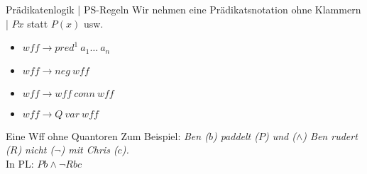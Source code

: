 \begin{frame}
  {Prädikatenlogik | PS-Regeln}
  \onslide<+->
  \onslide<+->
  Wir nehmen eine \alert{Prädikatsnotation ohne Klammern} | $Px$ statt $P(x)$ usw.\\
  \Halbzeile
  \begin{itemize}[<+->]
    \item $wff\rightarrow pred^1\ a_1\ldots\ a_n$ 
    \item $wff\rightarrow neg\ wff$ 
    \item $wff\rightarrow wff\ conn\ wff$ 
    \item $wff\rightarrow Q\ var\ wff$ 
  \end{itemize}
\end{frame}

\begin{frame}
  {Eine Wff ohne Quantoren}
  \onslide<+->
  \onslide<+->
  Zum Beispiel: \textit{Ben ($b$) paddelt ($P$) und ($\wedge$) Ben rudert ($R$) nicht ($\neg$) mit Chris ($c$).}\\
  In PL: \alert{$Pb\wedge\neg Rbc$}\\
  \onslide<+->
  \Zeile
  \centering
  \scalebox{0.8}{\begin{forest}
    [$wff$, calign=child, calign child=2
      [$wff$
        [$pred^1$
          [$P$]
        ]
        [$a$
          [$const$
            [$b$]
          ]
        ]
      ]
      [$conn$
        [$\wedge$]
      ]
      [$wff$
        [$\neg$]
        [$wff$, calign=child, calign child=2
          [$pred^2$
            [$R$]
          ]
          [$a$
            [$const$
              [$b$]
            ]
          ]
          [$a$
            [$const$
              [$c$]
            ]
          ]
        ]
      ]
    ]
  \end{forest}}
\end{frame}

